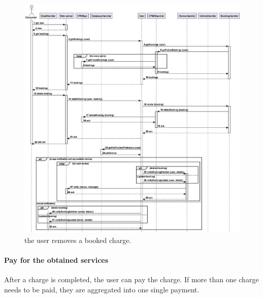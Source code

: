 \begin{figure}[h!]
    \centering
    \includegraphics[width=\columnwidth]{./images/sequences/emsp/book_delete}
    \caption{the user removes a booked charge.}
\end{figure}

\pagebreak

\paragraph{Pay for the obtained services} After a charge is completed, the user can pay the charge. If more than one charge needs to be paid, they are aggregated into one single payment.

